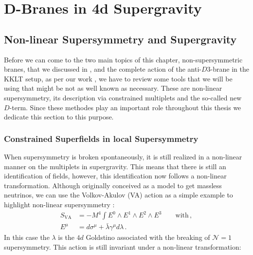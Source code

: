 \documentclass[a4paper,12pt]{report}
\newcommand{\bea}{\begin{equation}\begin{aligned}}
\newcommand{\eea}{\end{aligned}\end{equation}}
\begin{document}
\chapter{D-Branes in 4d Supergravity}
\label{sec:antiD3}

\section{Non-linear Supersymmetry and Supergravity}
\label{sec:multiplets}
Before we can come to the two main topics of this chapter, non-supersymmetric branes, that we discussed in \cite{Cribiori:2020bgt}, and the complete action of the anti-$D3$-brane in the KKLT setup, as per our work \cite{Cribiori:2019hod}, we have to review some tools that we will be using that might be not as well known as necessary. These are non-linear supersymmetry, its description via constrained multiplets and the so-called new $D$-term. Since these methodes play an important role throughout this thesis we dedicate this section to this purpose.
\subsection{Constrained Superfields in local Supersymmetry}
When supersymmetry is broken spontaneously, it is still realized in a non-linear manner on the multiplets in supergravity. This means that there is still an identification of fields, however, this identification now follows a non-linear transformation. Although originally conceived as a model to get massless neutrinos, we can use the Volkov-Akulov (VA) action \cite{Volkov:1972jx} as a simple example to highlight non-linear supersymmetry \cite{Kallosh:2016aep}:
\bea
S_{\text{VA}} &= -M^4 \int E^0 \wedge E^1 \wedge E^2 \wedge E^3\qquad \text{with}\,,\\
E^\mu &= d\sigma^\mu + \bar{\lambda} \gamma^\mu d\lambda\,.
\label{eq:VAorigin}
\eea
In this case the $\lambda$ is the $4d$ Goldstino associated with the breaking of $\mathcal{N}=1$ supersymmetry. This action is still invariant under a non-linear transformation:
\end{document}
